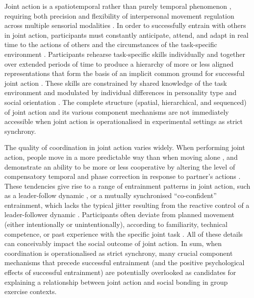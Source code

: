 \begin{CJK}{UTF8}{gbsn}
Joint action is a spatiotemporal rather than purely temporal phenomenon \citep{Phillips-Silver2012}, requiring both precision and flexibility of interpersonal movement regulation across multiple sensorial modalities \citep{Keller2014}.  In order to successfully entrain with others in joint action, participants must constantly anticipate, attend, and adapt in real time to the actions of others and the circumstances of the task-specific environment \citep{Vesper2017}. Participants rehearse task-specific skills individually and together over extended periods of time to produce a hierarchy of more or less aligned representations that form the basis of an implicit common ground for successful joint action \citep{Noy2017}.  These skills are constrained by shared knowledge of the task environment \citep{Vesper2017} and modulated by individual differences in personality type and social orientation \citep{Marsh2009,Keller2014}.  The complete structure (spatial, hierarchical, and sequenced) of joint action and its various component mechanisms are not immediately accessible when joint action is operationalised in experimental settings as strict synchrony.

The quality of coordination in joint action varies widely.  When performing joint action, people move in a more predictable way than when moving alone \citep{Vesper2011}, and demonstrate an ability to be more or less cooperative by altering the level of compensatory temporal and phase correction in response to partner's actions \citep{Repp2008}.  These tendencies give rise to a range of entrainment patterns in joint action, such as a leader-follow dynamic \citep[usually in situations where there is a skill disparity between participants,][]{Fairhurst2014}, or a mutually synchronised ``co-confident'' entrainment, which lacks the typical jitter resulting from the reactive control of a leader-follower dynamic \citep{Noy2011,Noy2015}.  Participants often deviate from planned movement (either intentionally or unintentionally), according to familiarity, technical competence, or past experience with the specific joint task \citep{Goebl2009}.  All of these details can conceivably impact the social outcome of joint action.  In sum, when coordination is operationalised as strict synchrony, many crucial component mechanisms that precede successful entrainment (and the positive psychological effects of successful entrainment) are potentially overlooked as candidates for explaining a relationship between joint action and social bonding in group exercise contexts.


\end{CJK}
